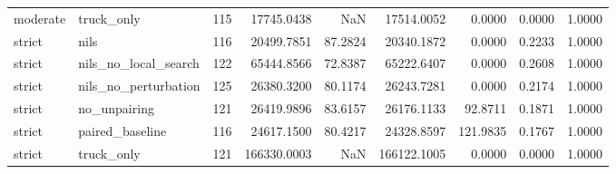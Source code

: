 \begin{tabular}{llrrrrrrr}
moderate & truck_only & 115 & 17745.0438 & NaN & 17514.0052 & 0.0000 & 0.0000 & 1.0000 \\
strict & nils & 116 & 20499.7851 & 87.2824 & 20340.1872 & 0.0000 & 0.2233 & 1.0000 \\
strict & nils_no_local_search & 122 & 65444.8566 & 72.8387 & 65222.6407 & 0.0000 & 0.2608 & 1.0000 \\
strict & nils_no_perturbation & 125 & 26380.3200 & 80.1174 & 26243.7281 & 0.0000 & 0.2174 & 1.0000 \\
strict & no_unpairing & 121 & 26419.9896 & 83.6157 & 26176.1133 & 92.8711 & 0.1871 & 1.0000 \\
strict & paired_baseline & 116 & 24617.1500 & 80.4217 & 24328.8597 & 121.9835 & 0.1767 & 1.0000 \\
strict & truck_only & 121 & 166330.0003 & NaN & 166122.1005 & 0.0000 & 0.0000 & 1.0000 \\
\bottomrule
\end{tabular}
